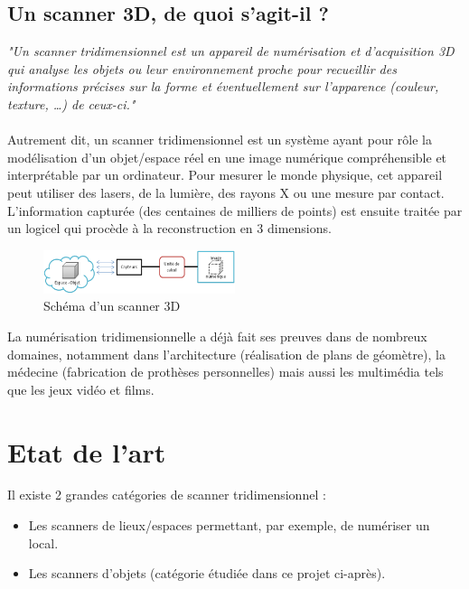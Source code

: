 \documentclass[a4paper,10pt]{report}
\begin{document}
\section{Un scanner 3D, de quoi s'agit-il ?}
\textit{"Un scanner tridimensionnel est un appareil de numérisation et d’acquisition 3D qui analyse les objets ou leur environnement proche pour recueillir des informations précises sur la forme et éventuellement sur l'apparence (couleur, texture, …) de ceux-ci."}\cite{wikiscan3d}
\\
\\
Autrement dit, un scanner tridimensionnel est un système ayant pour rôle la modélisation d'un objet/espace réel en une image numérique compréhensible et interprétable par un ordinateur. Pour mesurer le monde physique, cet appareil peut utiliser des lasers, de la lumière, des rayons X ou une mesure par contact. L'information capturée (des centaines de milliers de points) est ensuite traitée par un logicel qui procède à la reconstruction en 3 dimensions.
\begin{figure}[h!]
\centering
\includegraphics[width=0.5\textwidth]{model_scanner.png}
\caption{Schéma d'un scanner 3D}
\end{figure}
La numérisation tridimensionnelle a déjà fait ses preuves dans de nombreux domaines, notamment dans l’architecture (réalisation de plans de géomètre), la médecine (fabrication de prothèses personnelles) mais aussi les multimédia tels que les jeux vidéo et films.

\chapter{Etat de l'art}
Il existe 2 grandes catégories de scanner tridimensionnel :
\begin{itemize}
\item Les scanners de lieux/espaces permettant, par exemple, de numériser un local. 
\item Les scanners d’objets (catégorie étudiée dans ce projet ci-après).
\end{itemize}
\end{document}
